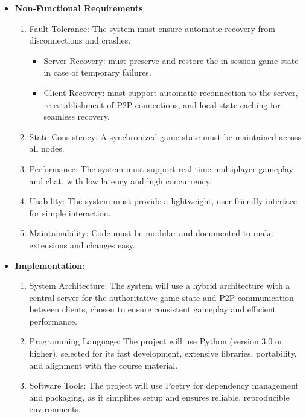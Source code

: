 \documentclass{scrartcl}
\begin{document}
\begin{itemize}
\begin{enumerate}
\begin{itemize}
        \item 10 points for a valid answer not used by anyone else in the same category;
        \item 5 points for a valid answer but used by at least one other player in the same category;
        \item 0 points for an invalid answer.
      \end{itemize}
      The round points are the sum of each category points.
  \end{enumerate}
  \item \textbf{Non-Functional Requirements}:
    \begin{enumerate}
      \item Fault Tolerance:
        The system must ensure automatic recovery from disconnections and crashes.
        \begin{itemize}
          \item Server Recovery:
            must preserve and restore the in-session game state in case of temporary failures.
          \item Client Recovery:
            must support automatic reconnection to the server, re-establishment of P2P connections, 
            and local state caching for seamless recovery.
        \end{itemize}
      \item State Consistency:
        A synchronized game state must be maintained across all nodes.
      \item Performance:
        The system must support real-time multiplayer gameplay and chat, with low latency and high concurrency.
      \item Usability:
        The system must provide a lightweight, user-friendly interface for simple interaction.
      \item Maintainability: 
        Code must be modular and documented to make extensions and changes easy.
   \end{enumerate}
  \item \textbf{Implementation}:
    \begin{enumerate}
      \item System Architecture:  
      The system will use a hybrid architecture with a central server for the authoritative game state 
      and P2P communication between clients, chosen to ensure consistent gameplay and efficient performance.
      \item Programming Language:  
      The project will use Python (version 3.0 or higher), 
      selected for its fast development, extensive libraries, portability, and alignment with the course material.
      \item Software Tools:  
      The project will use Poetry for dependency management and packaging, 
      as it simplifies setup and ensures reliable, reproducible environments.
    \end{enumerate}
\end{itemize}
\end{document}
